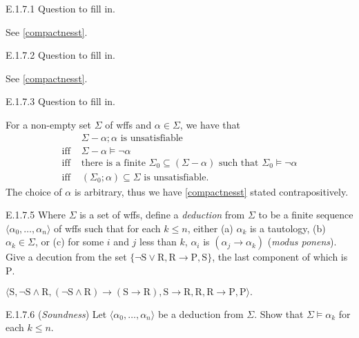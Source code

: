 \begin{exercise}{E.1.7.1}
  Question to fill in.
\end{exercise}

See \ref{compactnesst}.

\begin{exercise}{E.1.7.2}
  Question to fill in.
\end{exercise}

See \ref{compactnesst}.

\begin{exercise}{E.1.7.3}
  Question to fill in.
\end{exercise}

For a non-empty set $\Sigma$ of wffs and $\alpha\in \Sigma$, we have that
\begin{align*}
              & \Sigma-\alpha;\alpha\text{ is unsatisfiable}                                                        \\
  \text{iff } & \Sigma-\alpha\vDash\neg\alpha                                                                       \\
  \text{iff } & \text{there is a finite }\Sigma_0\subseteq(\Sigma-\alpha)\text{ such that }\Sigma_0\vDash\neg\alpha \\
  \text{iff } & (\Sigma_0;\alpha)\subseteq \Sigma\text{ is unsatisfiable}.
\end{align*}
The choice of $\alpha$ is arbitrary, thus we have \ref{compactnesst} stated contrapositively.

\setcounter{exercise}{4}

\begin{exercise}{E.1.7.5}
  Where $\Sigma$ is a set of wffs, define a \textit{deduction} from $\Sigma$ to be a finite sequence $\langle \alpha_0,\dots,\alpha_n\rangle$ of wffs such that for each $k\leq n$, either (a) $\alpha_k$ is a tautology, (b) $\alpha_k\in \Sigma$, or (c) for some $i$ and $j$ less than $k$, $\alpha_i$ is $(\alpha_j\rightarrow \alpha_k)$ (\textit{modus ponens}). Give a decution from the set $\{\mathrm{\neg S\vee R, R\rightarrow P, S}\}$, the last component of which is $\mathrm{P}$.
\end{exercise}


$\mathrm{\langle S,\neg S\wedge R, (\neg S\wedge R)\rightarrow(S\rightarrow R), S\rightarrow R, R, R\rightarrow P, P\rangle.}$

\begin{exercise}{E.1.7.6}
  (\textit{Soundness}) Let $\langle \alpha_0,\dots,\alpha_n\rangle$ be a deduction from $\Sigma$. Show that $\Sigma\vDash \alpha_k$ for each $k\leq n$.
\end{exercise}

